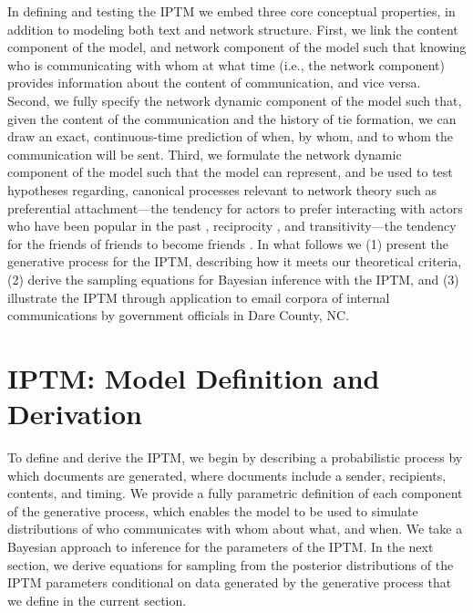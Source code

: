 \documentclass[a4paper]{article}
\begin{document}
In defining and testing the IPTM we embed three core conceptual properties, in addition to modeling both text and network structure. First, we link the content component of the model, and network component of the model such that knowing who is communicating with whom at what time (i.e., the network component) provides information about the content of communication,  and vice versa. Second, we fully specify the network dynamic component of the model such that, given the content of the communication and the history of tie formation, we can draw an exact, continuous-time prediction of when, by whom, and to whom the communication will be sent. Third, we formulate the network dynamic component of the model such that the model can represent, and be used to test hypotheses regarding, canonical processes relevant to network theory such as preferential attachment---the tendency for actors to prefer interacting with actors who have been popular in the past \citep{barabasi1999emergence,vazquez2003growing,jeong2003measuring}, reciprocity \citep{hammer1985implications,rao1987measures}, and transitivity---the tendency for the friends of friends to become friends \citep{louch2000personal,burda2004network}. In what follows we (1) present the generative process for the IPTM, describing how it meets our theoretical criteria, (2) derive the sampling equations for Bayesian inference with the IPTM, and (3) illustrate the IPTM through application to email corpora of internal communications by government officials in Dare County, NC. 

\section{IPTM: Model Definition and Derivation} \label{sec: Generative Process}

To define and derive the IPTM, we begin by describing a probabilistic process by which documents are generated, where documents include a sender, recipients, contents, and timing. We provide a fully parametric definition of each component of the generative process, which enables the model to be used to simulate distributions of who communicates with whom about what, and when. We take a Bayesian approach to inference for the parameters of the IPTM. In the next section, we derive equations for sampling from the posterior distributions of the IPTM parameters conditional on data generated by the generative process that we define in the current section.
\end{document}
